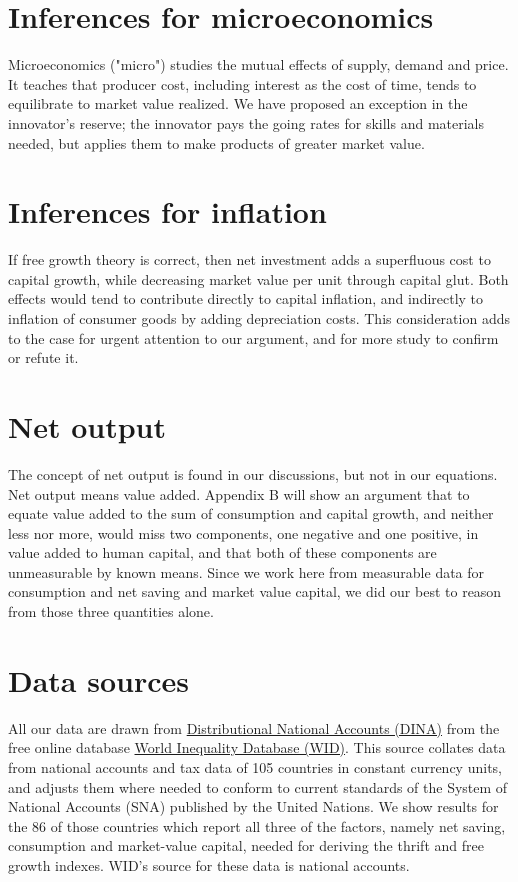 \documentclass[a4paper,fleqn]{latex_styles/cas-sc}
\begin{document}
\section{Inferences for microeconomics}

Microeconomics ("micro") studies the mutual effects of supply, demand and price. It teaches that producer cost, including interest as the cost of time, tends to equilibrate to market value realized. We have proposed an exception in the innovator's reserve; the innovator pays the going rates for skills and materials needed, but applies them to make products of greater market value.

\section{Inferences for inflation}

If free growth theory is correct, then net investment adds a superfluous cost to capital growth, while decreasing market value per unit through capital glut. Both effects would tend to contribute directly to capital inflation, and indirectly to inflation of consumer goods by adding depreciation costs. This consideration adds to the case for urgent attention to our argument, and for more study to confirm or refute it.

\hypertarget{net-output}{
\section{Net output}\label{net-output}
}
The concept of net output is found in our discussions, but not in our equations. Net output means value added. Appendix B will show an argument that to equate value added to the sum of consumption and capital growth, and neither less nor more, would miss two components, one negative and one positive, in value added to human capital, and that both of these components are unmeasurable by known means. Since we work here from measurable data for consumption and net saving and market value capital, we did our best to reason from those three quantities alone.
%



\hypertarget{data-sources}{%
\section{Data sources}\label{data-sources}}

All our data are drawn from \href{https://wid.world/document/distributional-national-accounts-guidelines-2020-concepts-and-methods-used-in-the-world-inequality-database/}{Distributional National Accounts (DINA)} from the free online database \href{wid.world.com}{World
Inequality Database (WID)}. This source collates data from national accounts and tax data
of 105 countries in constant currency units, and adjusts them where needed to conform to current standards of the System of National Accounts
(SNA) published by the United Nations. We show results for the 86 of
those countries which report all three of the factors, namely net
saving, consumption and market-value capital, needed for deriving
the thrift and free growth indexes. WID's source for these data is national accounts.
\end{document}
